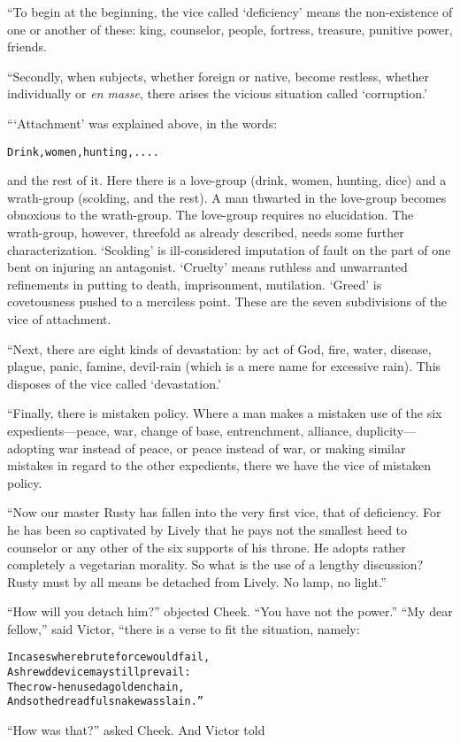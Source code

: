 \documentclass{article}
\renewenvironment{verbatim}{\begin{alltt}\normalfont\begin{centering}}{\end{centering}\end{alltt}}
\begin{document}
“To begin at the beginning, the vice called `deficiency' means the
non-existence of one or another of these: king, counselor, people,
fortress, treasure, punitive power, friends.

“Secondly, when subjects, whether foreign or native, become
restless, whether individually or \emph{en masse}, there arises the
vicious situation called `corruption.'

“`Attachment' was explained above, in the words:

\begin{verbatim}
Drink, women, hunting, ....
\end{verbatim}
and the rest of it. Here there is a love-group (drink, women,
hunting, dice) and a wrath-group (scolding, and the rest). A man
thwarted in the love-group becomes obnoxious to the wrath-group.
The love-group requires no elucidation. The wrath-group, however,
threefold as already described, needs some further
characterization. `Scolding' is ill-considered imputation of fault
on the part of one bent on injuring an antagonist. `Cruelty' means
ruthless and unwarranted refinements in putting to death,
imprisonment, mutilation. `Greed' is covetousness pushed to a
merciless point. These are the seven subdivisions of the vice of
attachment.

“Next, there are eight kinds of devastation: by act of God, fire,
water, disease, plague, panic, famine, devil-rain (which is a mere
name for excessive rain). This disposes of the vice called
`devastation.'

“Finally, there is mistaken policy. Where a man makes a mistaken
use of the six expedients---peace, war, change of base,
entrenchment, alliance, duplicity---adopting war instead of peace,
or peace instead of war, or making similar mistakes in regard to
the other expedients, there we have the vice of mistaken policy.

``Now our master Rusty has fallen into the very first vice, that of deficiency. For he has been so captivated by Lively that he pays not the smallest heed to counselor or any other of the six supports of his throne. He adopts rather completely a vegetarian morality. So what is the use of a lengthy discussion? Rusty must by all means be detached from Lively. No lamp, no light.''

``How will you detach him?'' objected Cheek.
``You have not the power.'' ``My dear fellow,'' said Victor, “there
is a verse to fit the situation, namely:

\begin{verbatim}
In cases where brute force would fail,
    A shrewd device may still prevail:
The crow-hen used a golden chain,
    And so the dreadful snake was slain.”
\end{verbatim}
``How was that?'' asked Cheek. And Victor told
\end{document}
